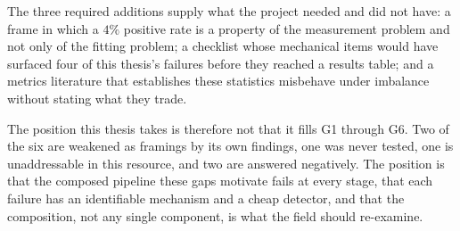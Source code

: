 The three required additions supply what the project needed and did not have: a
frame in which a $4\%$ positive rate is a property of the measurement problem
and not only of the fitting problem; a checklist whose mechanical items would
have surfaced four of this thesis's failures before they reached a results
table; and a metrics literature that establishes these statistics misbehave under
imbalance without stating what they trade.

The position this thesis takes is therefore not that it fills G1 through G6.
Two of the six are weakened as framings by its own findings, one was never
tested, one is unaddressable in this resource, and two are answered negatively.
The position is that the composed pipeline these gaps motivate fails at every
stage, that each failure has an identifiable mechanism and a cheap detector, and
that the composition, not any single component, is what the field should
re-examine.
